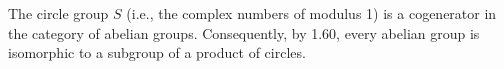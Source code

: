 The circle group $S$ (i.e., the complex numbers of modulus 1) is a cogenerator in the category of abelian groups. Consequently, by 1.60, every abelian group is isomorphic to a subgroup of a product of circles.
